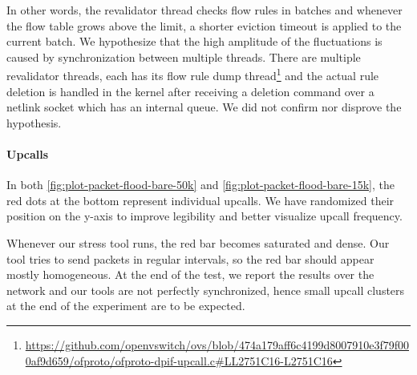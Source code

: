 In other words, the revalidator thread checks flow rules in batches and whenever the flow table grows above the limit, a shorter eviction timeout is applied to the current batch. We hypothesize that the high amplitude of the fluctuations is caused by synchronization between multiple threads. There are multiple revalidator threads, each has its flow rule dump thread\footnote{\url{https://github.com/openvswitch/ovs/blob/474a179aff6c4199d8007910e3f79f000af9d659/ofproto/ofproto-dpif-upcall.c\#LL2751C16-L2751C16}} and the actual rule deletion is handled in the kernel after receiving a deletion command over a netlink socket which has an internal queue. We did not confirm nor disprove the hypothesis.

\paragraph{Upcalls}
In both \cref{fig:plot-packet-flood-bare-50k} and \cref{fig:plot-packet-flood-bare-15k}, the red dots at the bottom represent individual upcalls. We have randomized their position on the y-axis to improve legibility and better visualize upcall frequency.

Whenever our stress tool runs, the red bar becomes saturated and dense. Our tool tries to send packets in regular intervals, so the red bar should appear mostly homogeneous. At the end of the test, we report the results over the network and our tools are not perfectly synchronized, hence small upcall clusters at the end of the experiment are to be expected.


